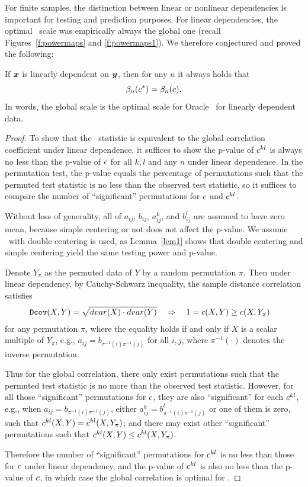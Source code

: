 \documentclass[11pt]{extarticle}
\begin{document}
For finite samples, the distinction between linear or nonlinear dependencies is important for testing and prediction purposes.
For linear dependencies,  the optimal \Mgc~scale was empirically always the global one (recall Figures~\ref{f:powermaps} and \ref{f:powermaps1}). We therefore conjectured and proved the following:
\begin{thm}
\label{t:linear}
If $\boldsymbol{x}$ is linearly dependent on $\boldsymbol{y}$, then for any $n$ it always holds that
\begin{equation}
\beta_n(c^*) = \beta_n(c).
\end{equation}
In words, the global scale is the optimal scale for Oracle \Mgc~for linearly dependent data.
\end{thm}
\begin{proof}
To show that the \Mgc~statistic is equivalent to the global correlation coefficient under linear dependence, it suffices to show the p-value of $c^{kl}$ is always no less than the p-value of $c$ for all $k,l$ and any $n$ under linear dependence. In the permutation test, the p-value equals the percentage of permutations such that the permuted test statistic is no less than the observed test statistic, so it suffices to compare the number of ``significant'' permutations for $c$ and $c^{kl}$.

Without loss of generality, all of $a_{ij}$, $b_{ij}$, $a_{ij}^{k}$, and $b_{ij}^{l}$ are assumed to have zero mean, because simple centering or not does not affect the p-value. We assume \Dcorr~with double centering is used, as Lemma~\ref{lem1} shows that double centering and simple centering yield the same testing power and p-value.

Denote $Y_{\pi}$ as the permuted data of $Y$ by a random permutation $\pi$. Then under linear dependency, by Cauchy-Schwarz inequality, the  sample distance correlation satisfies
\begin{align*}
& {\sc \texttt{Dcov}}(X,Y) = \sqrt{dvar(X) \cdot dvar(Y)} \quad\Rightarrow\quad 1=c(X, Y) \geq c(X, Y_{\pi})
\end{align*}
for any permutation $\pi$, where the equality holds if and only if $X$ is a scalar multiple of $Y_{\pi}$, e.g., $a_{ij}=b_{\pi^{-1}(i) \pi^{-1}(j)}$ for all $i,j$, where $\pi^{-1}(\cdot)$ denotes the inverse permutation.

Thus for the global correlation, there only exist permutations such that the permuted test statistic is no more than the observed test statistic. However, for all those ``significant'' permutations for $c$, they are also ``significant'' for each $c^{kl}$, e.g., when $a_{ij}=b_{\pi^{-1}(i) \pi^{-1}(j)}$, either $a_{ij}^{k}=b_{\pi^{-1}(i) \pi^{-1}(j)}^{l}$ or one of them is zero, such that $c^{kl}(X, Y)=c^{kl}(X, Y_{\pi})$; and there may exist other ``significant'' permutations such that $c^{kl}(X, Y) \leq c^{kl}(X, Y_{\pi})$.

Therefore the number of ``significant'' permutations for $c^{kl}$ is no less than those for $c$ under linear dependency, and the p-value of $c^{kl}$ is also no less than the p-value of $c$, in which case the global correlation is optimal for \Mgc.
\end{proof}
\end{document}
